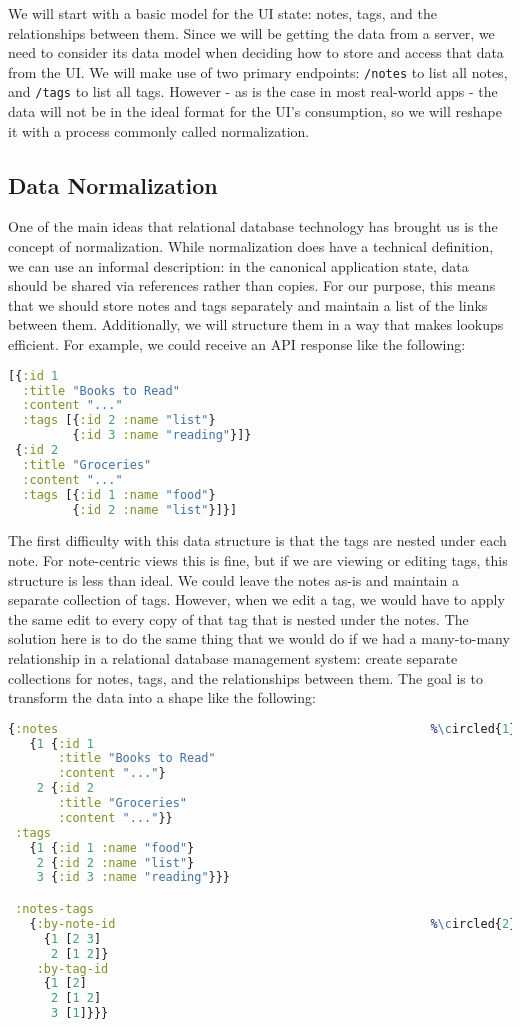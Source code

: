 \documentclass[10pt,twoside,openright]{memoir}
\newcommand*\circled[1]{\tikz[baseline=(char.base)]{
            \node[shape=circle,draw,inner sep=1pt] (char) {#1};}}
\begin{document}
We will start with a basic model for the UI state: notes, tags, and the
relationships between them. Since we will be getting the data from a
server, we need to consider its data model when deciding how to store
and access that data from the UI. We will make use of two primary
endpoints: \texttt{/notes} to list all notes, and \texttt{/tags} to list
all tags. However - as is the case in most real-world apps - the data
will not be in the ideal format for the UI's consumption, so we will
reshape it with a process commonly called normalization.


\subsection{Data Normalization}

One of the main ideas that relational database technology has brought us
is the concept of normalization. While normalization does have a
technical definition, we can use an informal description: in the
canonical application state, data should be shared via references rather
than copies. For our purpose, this means that we should store notes and
tags separately and maintain a list of the links between them.
Additionally, we will structure them in a way that makes lookups
efficient. For example, we could receive an API response like the
following:

\begin{lstlisting}[language=Clojure, caption={Data shape: source}]
[{:id 1
  :title "Books to Read"
  :content "..."
  :tags [{:id 2 :name "list"}
         {:id 3 :name "reading"}]}
 {:id 2
  :title "Groceries"
  :content "..."
  :tags [{:id 1 :name "food"}
         {:id 2 :name "list"}]}]
\end{lstlisting}

The first difficulty with this data structure is that the tags are
nested under each note. For note-centric views this is fine, but if we
are viewing or editing tags, this structure is less than ideal. We could
leave the notes as-is and maintain a separate collection of tags.
However, when we edit a tag, we would have to apply the same edit to
every copy of that tag that is nested under the notes. The solution here
is to do the same thing that we would do if we had a many-to-many
relationship in a relational database management system: create separate
collections for notes, tags, and the relationships between them. The
goal is to transform the data into a shape like the following:

\begin{lstlisting}[language=Clojure, caption={Data shape: result}]
{:notes                                                    %\circled{1}%
   {1 {:id 1
       :title "Books to Read"
       :content "..."}
    2 {:id 2
       :title "Groceries"
       :content "..."}}
 :tags
   {1 {:id 1 :name "food"}
    2 {:id 2 :name "list"}
    3 {:id 3 :name "reading"}}}

 :notes-tags
   {:by-note-id                                            %\circled{2}%
     {1 [2 3]
      2 [1 2]}
    :by-tag-id
     {1 [2]
      2 [1 2]
      3 [1]}}}
\end{lstlisting}
\end{document}
